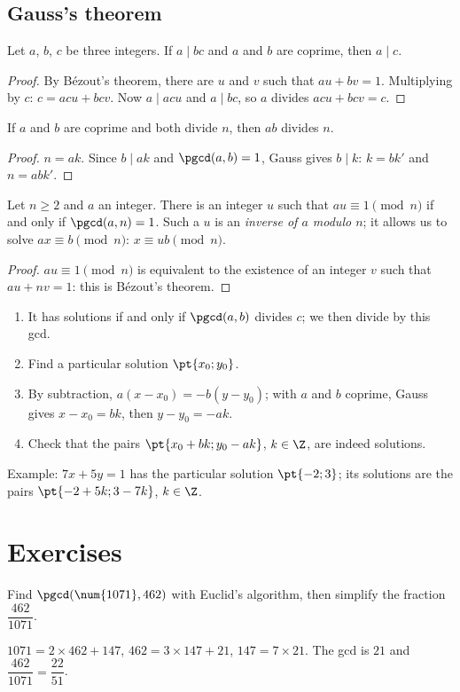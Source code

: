 \subsection{Gauss's theorem}
\begin{theorem}
Let $a$, $b$, $c$ be three integers. If $a\mid bc$ and $a$ and $b$ are coprime, then $a\mid c$.
\end{theorem}
\begin{proof}
By Bézout's theorem, there are $u$ and $v$ such that $au+bv=1$. Multiplying by $c$: $c=acu+bcv$. Now $a\mid acu$ and $a\mid bc$, so $a$ divides $acu+bcv=c$.
\end{proof}
\begin{theorem}[Corollary]
If $a$ and $b$ are coprime and both divide $n$, then $ab$ divides $n$.
\end{theorem}
\begin{proof}
$n=ak$. Since $b\mid ak$ and $\pgcd(a,b)=1$, Gauss gives $b\mid k$: $k=bk'$ and $n=abk'$.
\end{proof}
\begin{theorem}
Let $n\ge2$ and $a$ an integer. There is an integer $u$ such that $au\equiv1\pmod n$ if and only if $\pgcd(a,n)=1$. Such a $u$ is an \emph{inverse of $a$ modulo $n$}; it allows us to solve $ax\equiv b\pmod n$: $x\equiv ub\pmod n$.
\end{theorem}
\begin{proof}
$au\equiv1\pmod n$ is equivalent to the existence of an integer $v$ such that $au+nv=1$: this is Bézout's theorem.
\end{proof}
\begin{method}[Equation $ax+by=c$ in integers]
\begin{enumerate}
\item It has solutions if and only if $\pgcd(a,b)$ divides $c$; we then divide by this gcd.
\item Find a particular solution $\pt{x_0;y_0}$.
\item By subtraction, $a(x-x_0)=-b(y-y_0)$; with $a$ and $b$ coprime, Gauss gives $x-x_0=bk$, then $y-y_0=-ak$.
\item Check that the pairs $\pt{x_0+bk;y_0-ak}$, $k\in\Z$, are indeed solutions.
\end{enumerate}
Example: $7x+5y=1$ has the particular solution $\pt{-2;3}$; its solutions are the pairs $\pt{-2+5k;3-7k}$, $k\in\Z$.
\end{method}

\mxnewpage
\section{Exercises}
\begin{exercise}
Find $\pgcd(\num{1071},462)$ with Euclid's algorithm, then simplify the fraction $\dfrac{462}{\num{1071}}$.
\end{exercise}
\begin{solution}
$\num{1071}=2\times462+147$, $462=3\times147+21$, $147=7\times21$. The gcd is $21$ and $\dfrac{462}{\num{1071}}=\dfrac{22}{51}$.
\end{solution}

